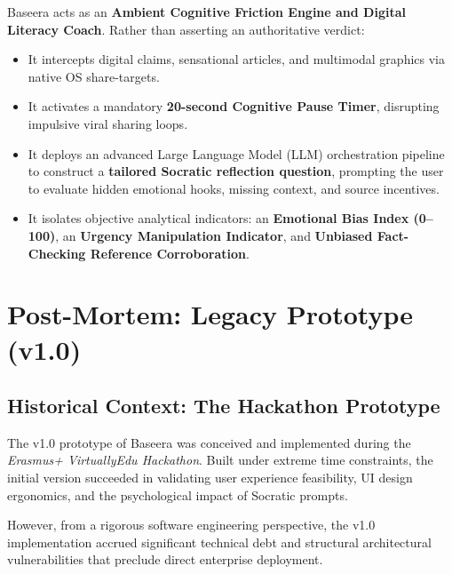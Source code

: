 \documentclass[11pt,a4paper]{report}
\begin{document}
Baseera acts as an \textbf{Ambient Cognitive Friction Engine and Digital Literacy Coach}. Rather than asserting an authoritative verdict:
\begin{itemize}
    \item It intercepts digital claims, sensational articles, and multimodal graphics via native OS share-targets.
    \item It activates a mandatory \textbf{20-second Cognitive Pause Timer}, disrupting impulsive viral sharing loops.
    \item It deploys an advanced Large Language Model (LLM) orchestration pipeline to construct a \textbf{tailored Socratic reflection question}, prompting the user to evaluate hidden emotional hooks, missing context, and source incentives.
    \item It isolates objective analytical indicators: an \textbf{Emotional Bias Index (0--100)}, an \textbf{Urgency Manipulation Indicator}, and \textbf{Unbiased Fact-Checking Reference Corroboration}.
\end{itemize}

\chapter{Post-Mortem: Legacy Prototype (v1.0)}

\section{Historical Context: The Hackathon Prototype}
The v1.0 prototype of Baseera was conceived and implemented during the \textit{Erasmus+ VirtuallyEdu Hackathon}. Built under extreme time constraints, the initial version succeeded in validating user experience feasibility, UI design ergonomics, and the psychological impact of Socratic prompts. 

However, from a rigorous software engineering perspective, the v1.0 implementation accrued significant technical debt and structural architectural vulnerabilities that preclude direct enterprise deployment.
\end{document}
